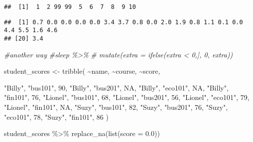\documentclass[
]{article}
\newenvironment{Shaded}{\begin{snugshade}}{\end{snugshade}}
\newcommand{\AttributeTok}[1]{\textcolor[rgb]{0.77,0.63,0.00}{#1}}
\newcommand{\CommentTok}[1]{\textcolor[rgb]{0.56,0.35,0.01}{\textit{#1}}}
\newcommand{\ConstantTok}[1]{\textcolor[rgb]{0.00,0.00,0.00}{#1}}
\newcommand{\DecValTok}[1]{\textcolor[rgb]{0.00,0.00,0.81}{#1}}
\newcommand{\FloatTok}[1]{\textcolor[rgb]{0.00,0.00,0.81}{#1}}
\newcommand{\FunctionTok}[1]{\textcolor[rgb]{0.00,0.00,0.00}{#1}}
\newcommand{\NormalTok}[1]{#1}
\newcommand{\OtherTok}[1]{\textcolor[rgb]{0.56,0.35,0.01}{#1}}
\newcommand{\SpecialCharTok}[1]{\textcolor[rgb]{0.00,0.00,0.00}{#1}}
\newcommand{\StringTok}[1]{\textcolor[rgb]{0.31,0.60,0.02}{#1}}
\begin{document}
\begin{verbatim}
##  [1]  1  2 99 99  5  6  7  8  9 10
\end{verbatim}

\begin{Shaded}
\end{Shaded}

\begin{verbatim}
##  [1] 0.7 0.0 0.0 0.0 0.0 3.4 3.7 0.8 0.0 2.0 1.9 0.8 1.1 0.1 0.0 4.4 5.5 1.6 4.6
## [20] 3.4
\end{verbatim}

\begin{Shaded}
\begin{Highlighting}[]
\CommentTok{\#another way}
\CommentTok{\#sleep \%\textgreater{}\%}
 \CommentTok{\# mutate(extra = ifelse(extra \textless{} 0,], 0, extra))}
\end{Highlighting}
\end{Shaded}

\begin{Shaded}
\begin{Highlighting}[]
\NormalTok{student\_scores }\OtherTok{\textless{}{-}} \FunctionTok{tribble}\NormalTok{(}
  \SpecialCharTok{\textasciitilde{}}\NormalTok{name, }\SpecialCharTok{\textasciitilde{}}\NormalTok{course, }\SpecialCharTok{\textasciitilde{}}\NormalTok{score,}

  \StringTok{"Billy"}\NormalTok{,  }\StringTok{"bus101"}\NormalTok{, }\DecValTok{90}\NormalTok{,}
  \StringTok{"Billy"}\NormalTok{,  }\StringTok{"bus201"}\NormalTok{, }\ConstantTok{NA}\NormalTok{,}
  \StringTok{"Billy"}\NormalTok{, }\StringTok{"eco101"}\NormalTok{, }\ConstantTok{NA}\NormalTok{,}
  \StringTok{"Billy"}\NormalTok{, }\StringTok{"fin101"}\NormalTok{, }\DecValTok{76}\NormalTok{,}
  \StringTok{"Lionel"}\NormalTok{, }\StringTok{"bus101"}\NormalTok{, }\DecValTok{68}\NormalTok{,}
  \StringTok{"Lionel"}\NormalTok{, }\StringTok{"bus201"}\NormalTok{, }\DecValTok{56}\NormalTok{,}
  \StringTok{"Lionel"}\NormalTok{, }\StringTok{"eco101"}\NormalTok{, }\DecValTok{79}\NormalTok{,}
  \StringTok{"Lionel"}\NormalTok{, }\StringTok{"fin101"}\NormalTok{, }\ConstantTok{NA}\NormalTok{,}
  \StringTok{"Suzy"}\NormalTok{, }\StringTok{"bus101"}\NormalTok{, }\DecValTok{82}\NormalTok{,}
  \StringTok{"Suzy"}\NormalTok{, }\StringTok{"bus201"}\NormalTok{, }\DecValTok{76}\NormalTok{,}
  \StringTok{"Suzy"}\NormalTok{, }\StringTok{"eco101"}\NormalTok{, }\DecValTok{78}\NormalTok{,}
  \StringTok{"Suzy"}\NormalTok{, }\StringTok{"fin101"}\NormalTok{, }\DecValTok{86}
\NormalTok{)}

\NormalTok{student\_scores }\SpecialCharTok{\%\textgreater{}\%}
  \FunctionTok{replace\_na}\NormalTok{(}\FunctionTok{list}\NormalTok{(}\AttributeTok{score =} \FloatTok{0.0}\NormalTok{))}
\end{Highlighting}
\end{Shaded}
\end{document}
